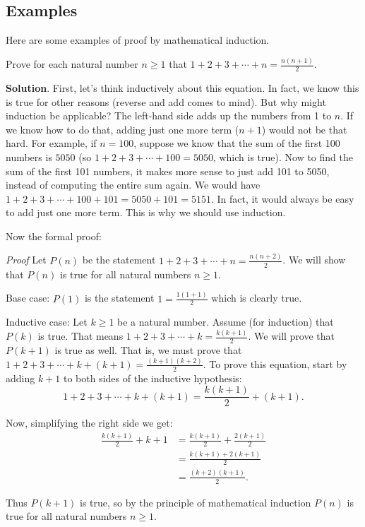 \documentclass[11pt,]{book}
\makeatletter
\theoremstyle{ptxplainnotitle}
\theoremstyle{ptxplaintitle}
\renewcommand*{\proofname}{Proof}
\renewenvironment{proof}[1][\proofname]{\par
  \pushQED{\qed}%
  \normalfont \topsep6\p@\@plus6\p@\relax
  \trivlist
  \item\relax
    {\itshape
    #1\@addpunct{.}}\hspace\labelsep\ignorespaces
}{%
  \popQED\endtrivlist\@endpefalse
}
\theoremstyle{ptxdefinitionnotitle}
\theoremstyle{ptxdefinitiontitle}
\theoremstyle{ptxdefinitionnotitle}
\theoremstyle{ptxdefinitiontitle}
\theoremstyle{ptxdefinitionnotitle}
\theoremstyle{ptxdefinitiontitle}
\theoremstyle{ptxdefinitiontitlenonumber}
\theoremstyle{ptxdefinitiontitlenonumber}
\numberwithin{equation}{chapter}
\newcommand{\amp}{&}
\makeatother
\begin{document}
\subsection[{Examples}]{Examples}\label{subsec_induction-examples}
\hypertarget{p-566}{}%
Here are some examples of proof by mathematical induction.%
\begin{example}\label{example-25}
\hypertarget{p-567}{}%
Prove for each natural number \(n \ge 1\) that \(1 + 2 + 3 + \cdots + n = \frac{n(n+1)}{2}\).%
\par\smallskip%
\noindent\textbf{Solution}.\hypertarget{solution-77}{}\quad%
\hypertarget{p-568}{}%
First, let's think inductively about this equation. In fact, we know this is true for other reasons (reverse and add comes to mind). But why might induction be applicable? The left-hand side adds up the numbers from 1 to \(n\). If we know how to do that, adding just one more term (\(n+1\)) would not be that hard. For example, if \(n = 100\), suppose we know that the sum of the first 100 numbers is \(5050\) (so \(1 + 2 + 3 + \cdots + 100 = 5050\), which is true). Now to find the sum of the first 101 numbers, it makes more sense to just add 101 to 5050, instead of computing the entire sum again. We would have \(1 + 2 + 3 + \cdots + 100 + 101 = 5050 + 101 = 5151\). In fact, it would always be easy to add just one more term. This is why we should use induction.%
\par
\hypertarget{p-569}{}%
Now the formal proof:%
\begin{proof}\hypertarget{proof-2}{}
\hypertarget{p-570}{}%
Let \(P(n)\) be the statement \(1 + 2 + 3 + \cdots + n = \frac{n(n+2)}{2}\). We will show that \(P(n)\) is true for all natural numbers \(n \ge 1\).%
\par
\hypertarget{p-571}{}%
Base case: \(P(1)\) is the statement \(1 = \frac{1(1+1)}{2}\) which is clearly true.%
\par
\hypertarget{p-572}{}%
Inductive case: Let \(k \ge 1\) be a natural number. Assume (for induction) that \(P(k)\) is true. That means \(1 + 2 + 3 + \cdots + k = \frac{k(k+1)}{2}\). We will prove that \(P(k+1)\) is true as well. That is, we must prove that \(1 + 2 + 3 + \cdots + k + (k+1) = \frac{(k+1)(k+2)}{2}\). To prove this equation, start by adding \(k+1\) to both sides of the inductive hypothesis:%
\begin{equation*}
1 + 2 + 3 + \cdots + k + (k+1) = \frac{k(k+1)}{2} + (k+1).
\end{equation*}
%
\par
\hypertarget{p-573}{}%
Now, simplifying the right side we get:%
\begin{align*}
\frac{k(k+1)}{2} + k+1 \amp = \frac{k(k+1)}{2} + \frac{2(k+1)}{2}\\
\amp = \frac{k(k+1) + 2(k+1)}{2}\\
\amp = \frac{(k+2)(k+1)}{2}.
\end{align*}
%
\par
\hypertarget{p-574}{}%
Thus \(P(k+1)\) is true, so by the principle of mathematical induction \(P(n)\) is true for all natural numbers \(n \ge 1\).%
\end{proof}
\end{example}
\end{document}
